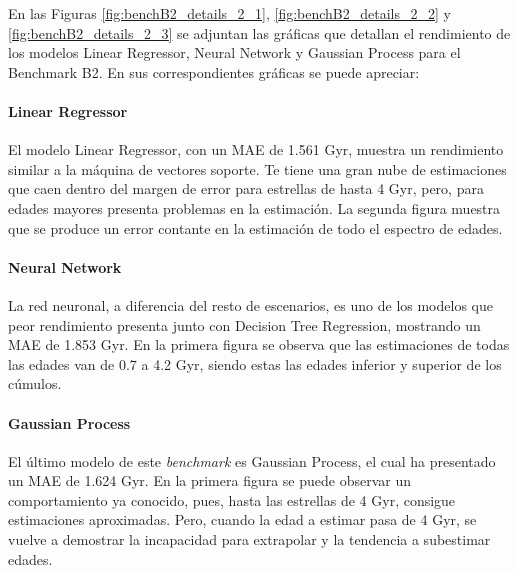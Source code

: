 En las Figuras \ref{fig:benchB2_details_2_1}, \ref{fig:benchB2_details_2_2} y \ref{fig:benchB2_details_2_3} se adjuntan las gráficas que detallan el rendimiento de los modelos Linear Regressor, Neural Network y Gaussian Process para el Benchmark B2. En sus correspondientes gráficas se puede apreciar:

\paragraph{Linear Regressor} 
El modelo Linear Regressor, con un MAE de 1.561 Gyr, muestra un rendimiento similar a la máquina de vectores soporte. Te tiene una gran nube de estimaciones que caen dentro del margen de error para estrellas de hasta 4 Gyr, pero, para edades mayores presenta problemas en la estimación. La segunda figura muestra que se produce un error contante en la estimación de todo el espectro de edades.

\paragraph{Neural Network} 
La red neuronal, a diferencia del resto de escenarios, es uno de los modelos que peor rendimiento presenta junto con Decision Tree Regression, mostrando un MAE de 1.853 Gyr. En la primera figura se observa que las estimaciones de todas las edades van de 0.7 a 4.2 Gyr, siendo estas las edades inferior y superior de los cúmulos.

\paragraph{Gaussian Process} 
El último modelo de este \emph{benchmark} es Gaussian Process, el cual ha presentado un MAE de 1.624 Gyr. En la primera figura se puede observar un comportamiento ya conocido, pues, hasta las estrellas de 4 Gyr, consigue estimaciones aproximadas. Pero, cuando la edad a estimar pasa de 4 Gyr, se vuelve a demostrar la incapacidad para extrapolar y la tendencia a subestimar edades.

